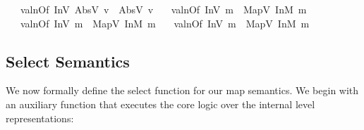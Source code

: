\begin{isabellebody}
\ \ {\isacharbar}{\kern0pt}\ {\isachardoublequoteopen}valnOf\ {\isacharparenleft}{\kern0pt}InV{}\ {\isacharparenleft}{\kern0pt}AbsV{}\ v{\isacharparenright}{\kern0pt}{\isacharparenright}{\kern0pt}\ {\isacharequal}{\kern0pt}\ {\isacharparenleft}{\kern0pt}AbsV\ v{\isacharparenright}{\kern0pt}{\isachardoublequoteclose}\isanewline
\ \ {\isacharbar}{\kern0pt}\ {\isachardoublequoteopen}valnOf\ {\isacharparenleft}{\kern0pt}InV{}\ m{\isacharparenright}{\kern0pt}\ {\isacharequal}{\kern0pt}\ {\isacharparenleft}{\kern0pt}MapV\ {\isacharparenleft}{\kern0pt}InM{}\ m{\isacharparenright}{\kern0pt}{\isacharparenright}{\kern0pt}{\isachardoublequoteclose}\isanewline
\ \ {\isacharbar}{\kern0pt}\ {\isachardoublequoteopen}valnOf\ {\isacharparenleft}{\kern0pt}InV{}\ m{\isacharparenright}{\kern0pt}\ {\isacharequal}{\kern0pt}\ {\isacharparenleft}{\kern0pt}MapV\ {\isacharparenleft}{\kern0pt}InM{}\ m{\isacharparenright}{\kern0pt}{\isacharparenright}{\kern0pt}{\isachardoublequoteclose}\isanewline
\ \ {\isacharbar}{\kern0pt}\ {\isachardoublequoteopen}valnOf\ {\isacharparenleft}{\kern0pt}InV{}\ m{\isacharparenright}{\kern0pt}\ {\isacharequal}{\kern0pt}\ {\isacharparenleft}{\kern0pt}MapV\ {\isacharparenleft}{\kern0pt}InM{}\ m{\isacharparenright}{\kern0pt}{\isacharparenright}{\kern0pt}{\isachardoublequoteclose}\isanewline
\isanewline
\end{isabellebody}


\subsection{Select Semantics}
\label{sec:select}

We now formally define the select function for our map semantics. We begin with an auxiliary function that executes the core logic over the internal level representations:


